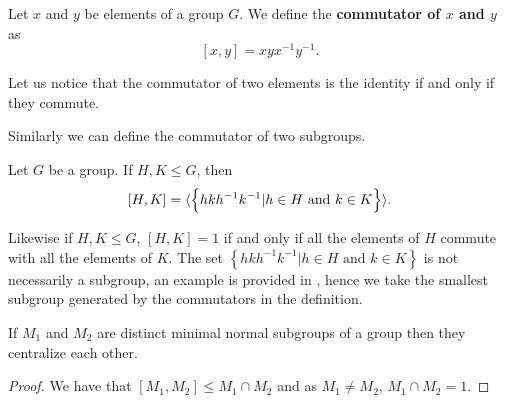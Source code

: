 \begin{definition}
    Let $x$ and $y$ be elements of a group $G$. We define the \textbf{commutator of $x$ and $y$} as 
    $$
    [x,y] = xyx^{-1}y^{-1}.
    $$
\end{definition}

Let us notice that the commutator of two elements is the identity if and only if they commute.

Similarly we can define the commutator of two subgroups.

\begin{definition}
    \label{S1:groupcommutator}
    Let $G$ be a group. If $H, K \le G$, then
    $$
    [H,K] = \langle \left\{ hkh^{-1}k^{-1} | h \in H \text{ and } k \in K \right\} \rangle.
    $$ 
\end{definition}

Likewise if $H,K \le G$, $[H,K] = 1$ if and only if all the elements of $H$ commute with all the elements of $K$.
The set $\left\{ hkh^{-1}k^{-1} | h \in H \text{ and } k \in K \right\}$ is not necessarily a subgroup, an example is provided in \cite{CassidyPCANACAE}, hence we take the smallest subgroup generated by the commutators in the definition.

\begin{theorem}
    \label{mnsubsc}
    If $M_1$ and $M_2$ are distinct minimal normal subgroups of a group then they centralize each other.
\end{theorem}

\begin{proof}
    We have that $[ M_1, M_2] \le M_1 \cap M_2$ and as $M_1 \ne M_2$, $M_1 \cap M_2 = 1$.
\end{proof}
